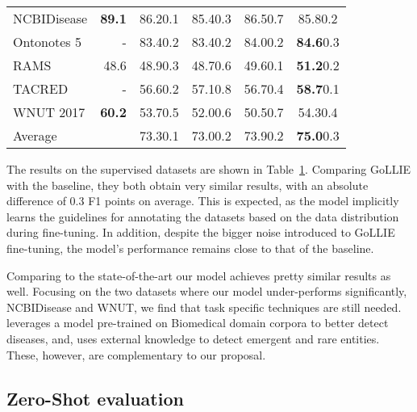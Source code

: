\documentclass{article} \usepackage{iclr2024_conference,times}
\begin{document}
\begin{table}
\begin{tabular}{l|r|cc|cc}
            NCBIDisease & \citep{10.1007/978-3-030-68763-2_48} \textbf{89.1} & 86.2\tiny{0.1} & 85.4\tiny{0.3} & 86.5\tiny{0.7} & 85.8\tiny{0.2} \\
            
            Ontonotes 5 & - & 83.4\tiny{0.2} & 83.4\tiny{0.2} & 84.0\tiny{0.2} & \textbf{84.6}\tiny{0.3} \\
            
            RAMS & \citep{li-etal-2021-document} 48.6 & 48.9\tiny{0.3} & 48.7\tiny{0.6} & 49.6\tiny{0.1} & \textbf{51.2}\tiny{0.2} \\
            
            TACRED & - & 56.6\tiny{0.2} & 57.1\tiny{0.8} & 56.7\tiny{0.4} & \textbf{58.7}\tiny{0.1} \\
            
            WNUT 2017 & \citep{wang-etal-2021-improving} \textbf{60.2} & 53.7\tiny{0.5} & 52.0\tiny{0.6}  & 50.5\tiny{0.7} & 54.3\tiny{0.4} \\
            
            \midrule
            Average & & 73.3\tiny{0.1}  & 73.0\tiny{0.2} & 73.9\tiny{0.2} & \textbf{75.0}\tiny{0.3} \\
            \bottomrule
        \end{tabular}
\label{tab:main-results}
\end{table}

The results on the supervised datasets are shown in Table~\ref{tab:main-results}. Comparing GoLLIE with the baseline, they both obtain very similar results, with an absolute difference of 0.3 F1 points on average. This is expected, as the model implicitly learns the guidelines for annotating the datasets based on the data distribution during fine-tuning. In addition, despite the bigger noise introduced to GoLLIE fine-tuning, the model's performance remains close to that of the baseline.

Comparing to the state-of-the-art our model achieves pretty similar results as well. Focusing on the two datasets where our model under-performs significantly, NCBIDisease and WNUT, we find that task specific techniques are still needed. \cite{10.1007/978-3-030-68763-2_48} leverages a model pre-trained on Biomedical domain corpora to better detect diseases, and, \cite{wang-etal-2021-improving} uses external knowledge to detect emergent and rare entities. These, however, are complementary to our proposal. 


\subsection{Zero-Shot evaluation}
\end{document}
